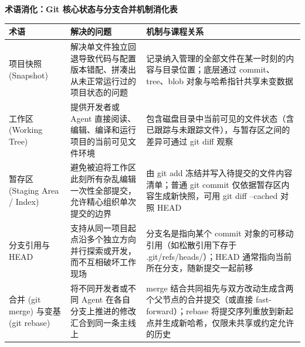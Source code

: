 \documentclass[UTF8,a4paper,11pt,fontset=fandol]{ctexart}
\begin{document}
\par{}\textbf{术语消化：Git 核心状态与分支合并机制消化表}

\begin{center}\small\begin{tabularx}{\linewidth}{YYY}

\toprule

术语 & 解决的问题 & 机制与课程关系\\\midrule

项目快照 (Snapshot) & 解决单文件独立回退导致代码与配置版本错配、拼凑出从未正常运行过的项目状态的问题 & 记录纳入管理的全部文件在某一时刻的内容与目录位置；底层通过 commit、tree、blob 对象与哈希指针共享未变数据\\[3pt]

工作区 (Working Tree) & 提供开发者或 Agent 直接阅读、编辑、编译和运行项目的当前可见文件环境 & 包含磁盘目录中当前可见的文件状态（含已跟踪与未跟踪文件），与暂存区之间的差异可通过 git diff 观察\\[3pt]

暂存区 (Staging Area / Index) & 避免被迫将工作区此刻所有杂乱编辑一次性全部提交，允许精心组织单次提交的边界 & 由 git add 冻结并写入待提交的文件内容清单；普通 git commit 仅依据暂存区内容生成新快照，可用 git diff --cached 对照 HEAD\\[3pt]

分支引用与 HEAD & 支持从同一项目起点沿多个独立方向并行探索或开发，而不互相破坏工作现场 & 分支名是指向某个 commit 对象的可移动引用（如松散引用下存于 .git/refs/heads/）；HEAD 通常指向当前所在分支，随新提交一起前移\\[3pt]

合并 (git merge) 与变基 (git rebase) & 将不同开发者或不同 Agent 在各自分支上推进的修改汇合到同一条主线上 & merge 结合共同祖先与双方改动生成含两个父节点的合并提交（或直接 fast-forward）；rebase 将提交序列重放到新起点并生成新哈希，仅限未共享或约定允许的历史\\[3pt]

\bottomrule\end{tabularx}\end{center}
\end{document}
